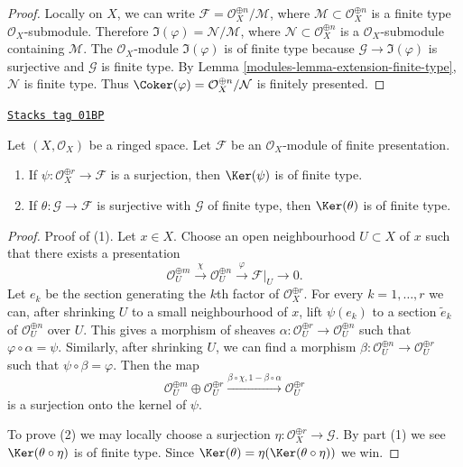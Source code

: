 \begin{proof}

Locally on $X$, we can write
$\mathcal{F} = \mathcal{O}_X^{\oplus n} / \mathcal{M}$, where
$\mathcal{M} \subset \mathcal{O}_X^{\oplus n}$ is a finite type
$\mathcal{O}_X$-submodule. Therefore
$\Im(\varphi) = \mathcal{N} / \mathcal{M}$, where
$\mathcal{N} \subset \mathcal{O}_X^{\oplus n}$ is a
$\mathcal{O}_X$-submodule containing $\mathcal{M}$.
The $\mathcal{O}_X$-module $\Im(\varphi)$ is of finite type
because $\mathcal{G} \to \Im(\varphi)$ is surjective and
$\mathcal{G}$ is finite type. By Lemma \ref{modules-lemma-extension-finite-type},
$\mathcal{N}$ is finite type. Thus
$\Coker(\varphi) = \mathcal{O}_X^{\oplus n} / \mathcal{N}$
is finitely presented.
\end{proof}

\begin{lemma}
\label{modules-lemma-kernel-surjection-finite-free-onto-finite-presentation}
\href{https://stacks.math.columbia.edu/tag/01BP}{\texttt{Stacks tag 01BP}}

Let $(X, \mathcal{O}_X)$ be a ringed space.
Let $\mathcal{F}$ be an $\mathcal{O}_X$-module of finite presentation.
\begin{enumerate}
\item If $\psi : \mathcal{O}_X^{\oplus r} \to \mathcal{F}$ is a surjection,
then $\Ker(\psi)$ is of finite type.
\item If $\theta : \mathcal{G} \to \mathcal{F}$ is surjective with
$\mathcal{G}$ of finite type, then $\Ker(\theta)$ is of finite type.
\end{enumerate}
\end{lemma}

\begin{proof}
Proof of (1).
Let $x \in X$. Choose an open neighbourhood $U \subset X$ of $x$
such that there exists a presentation
$$
\mathcal{O}_U^{\oplus m}
\xrightarrow{\chi}
\mathcal{O}_U^{\oplus n}
\xrightarrow{\varphi}
\mathcal{F}|_U
\to
0.
$$
Let $e_k$ be the section generating the $k$th factor of
$\mathcal{O}_X^{\oplus r}$. For every $k = 1, \ldots, r$
we can, after shrinking $U$ to a small neighbourhood of $x$,
lift $\psi(e_k)$ to a section $\tilde e_k$ of
$\mathcal{O}_U^{\oplus n}$ over $U$. This gives a morphism
of sheaves $\alpha : \mathcal{O}_U^{\oplus r} \to \mathcal{O}_U^{\oplus n}$
such that $\varphi \circ \alpha = \psi$.
Similarly, after shrinking $U$, we can find a morphism
$\beta : \mathcal{O}_U^{\oplus n} \to \mathcal{O}_U^{\oplus r}$
such that $\psi \circ \beta = \varphi$. Then the map
$$
\mathcal{O}_U^{\oplus m} \oplus
\mathcal{O}_U^{\oplus r}
\xrightarrow{\beta \circ \chi, 1 - \beta \circ \alpha}
\mathcal{O}_U^{\oplus r}
$$
is a surjection onto the kernel of $\psi$.

\medskip\noindent
To prove (2) we may locally choose a surjection
$\eta : \mathcal{O}_X^{\oplus r} \to \mathcal{G}$.
By part (1) we see $\Ker(\theta \circ \eta)$ is of finite type.
Since $\Ker(\theta) = \eta(\Ker(\theta \circ \eta))$ we win.
\end{proof}

